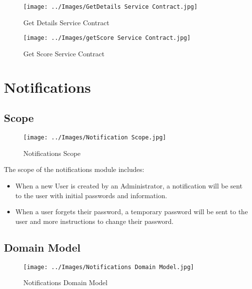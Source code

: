 \documentclass[11pt,a4paper]{article}
\begin{document}
\begin{figure}[H]
	\begin{center}
		\texttt{[image: ../Images/GetDetails Service Contract.jpg]}
		\caption{Get Details Service Contract}
	\end{center}
\end{figure}


\begin{figure}[H]
	\begin{center}
		\texttt{[image: ../Images/getScore Service Contract.jpg]}
		\caption{Get Score Service Contract}
	\end{center}
\end{figure}


\pagebreak

\section{Notifications}
\subsection{Scope}
\begin{figure}[H]
	\begin{center}
		\texttt{[image: ../Images/Notification Scope.jpg]}
		\caption{Notifications Scope}
	\end{center}
\end{figure}
The scope of the notifications module includes:
\begin{itemize}
	\item When a new User is created by an Administrator, a notification will be sent to the user with initial passwords and information.
	\item When a user forgets their password, a temporary password will be sent to the user and more instructions to change their password.
\end{itemize}


\subsection{Domain Model}

\begin{figure}[H]
	\begin{center}
		\texttt{[image: ../Images/Notifications Domain Model.jpg]}
		\caption{Notifications Domain Model}
	\end{center}
\end{figure}
\end{document}
